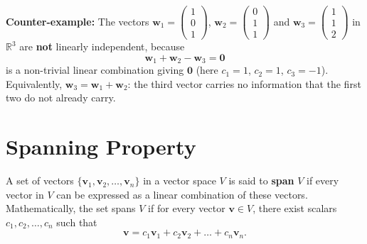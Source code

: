 \documentclass[]{article}
\begin{document}
	\noindent \textbf{Counter-example:}
	The vectors
	$\mathbf{w}_1 = \begin{pmatrix} 1 \\ 0 \\ 1 \end{pmatrix}$,
	$\mathbf{w}_2 = \begin{pmatrix} 0 \\ 1 \\ 1 \end{pmatrix}$
	and
	$\mathbf{w}_3 = \begin{pmatrix} 1 \\ 1 \\ 2 \end{pmatrix}$
	in $\mathbb{R}^3$ are \textbf{not} linearly independent, because
	$$
	\mathbf{w}_1 + \mathbf{w}_2 - \mathbf{w}_3 = \mathbf{0}
	$$
	is a non-trivial linear combination giving $\mathbf{0}$ (here $c_1 = 1$, $c_2 = 1$, $c_3 = -1$).
	Equivalently, $\mathbf{w}_3 = \mathbf{w}_1 + \mathbf{w}_2$: the third vector carries no information that the first two do not already carry.
	
	\section{Spanning Property}
	
	A set of vectors $\{\mathbf{v}_1, \mathbf{v}_2, \dots, \mathbf{v}_n\}$ in a vector space $V$ is said to \textbf{span} $V$ if every vector in $V$ can be expressed as a linear combination of these vectors.
	Mathematically, the set spans $V$ if for every vector $\mathbf{v} \in V$, there exist scalars $c_1, c_2, \dots, c_n$ such that
	$$
	\mathbf{v} = c_1\mathbf{v}_1 + c_2\mathbf{v}_2 + \dots + c_n\mathbf{v}_n.
	$$
	
\end{document}
